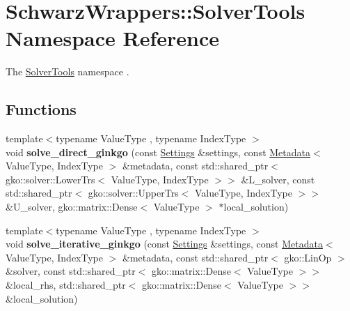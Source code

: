 \hypertarget{namespaceSchwarzWrappers_1_1SolverTools}{}\section{Schwarz\+Wrappers\+:\+:Solver\+Tools Namespace Reference}
\label{namespaceSchwarzWrappers_1_1SolverTools}


The \hyperlink{namespaceSchwarzWrappers_1_1SolverTools}{Solver\+Tools} namespace .  


\subsection*{Functions}
\begin{DoxyCompactItemize}
\item 
\mbox{\label{namespaceSchwarzWrappers_1_1SolverTools_a543ae60502c1f038dbbbf06a8eef6612}} 
{\footnotesize template$<$typename Value\+Type , typename Index\+Type $>$ }\\void {\bfseries solve\+\_\+direct\+\_\+ginkgo} (const \hyperlink{structSchwarzWrappers_1_1Settings}{Settings} \&settings, const \hyperlink{structSchwarzWrappers_1_1Metadata}{Metadata}$<$ Value\+Type, Index\+Type $>$ \&metadata, const std\+::shared\+\_\+ptr$<$ gko\+::solver\+::\+Lower\+Trs$<$ Value\+Type, Index\+Type $>$$>$ \&L\+\_\+solver, const std\+::shared\+\_\+ptr$<$ gko\+::solver\+::\+Upper\+Trs$<$ Value\+Type, Index\+Type $>$$>$ \&U\+\_\+solver, gko\+::matrix\+::\+Dense$<$ Value\+Type $>$ $\ast$local\+\_\+solution)
\item 
\mbox{\label{namespaceSchwarzWrappers_1_1SolverTools_aa6565c66ced28257126628dfcef5759b}} 
{\footnotesize template$<$typename Value\+Type , typename Index\+Type $>$ }\\void {\bfseries solve\+\_\+iterative\+\_\+ginkgo} (const \hyperlink{structSchwarzWrappers_1_1Settings}{Settings} \&settings, const \hyperlink{structSchwarzWrappers_1_1Metadata}{Metadata}$<$ Value\+Type, Index\+Type $>$ \&metadata, const std\+::shared\+\_\+ptr$<$ gko\+::\+Lin\+Op $>$ \&solver, const std\+::shared\+\_\+ptr$<$ gko\+::matrix\+::\+Dense$<$ Value\+Type $>$$>$ \&local\+\_\+rhs, std\+::shared\+\_\+ptr$<$ gko\+::matrix\+::\+Dense$<$ Value\+Type $>$$>$ \&local\+\_\+solution)
\item 
\mbox{\label{namespaceSchwarzWrappers_1_1SolverTools_aaee0d8f44ffb632b4b58dad045c53b57}} 

\end{DoxyCompactItemize}
